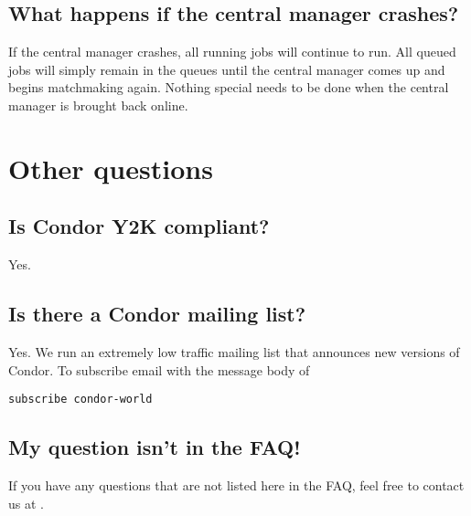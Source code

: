 \subsection{What happens if the central manager crashes?} 

If the central manager crashes, all running jobs will continue to
run. All queued jobs will simply remain in the queues until the central
manager comes up and begins matchmaking again.  Nothing special needs
to be done when the central manager is brought back online. 


\section{Other questions}


\subsection{Is Condor Y2K compliant?}

Yes.

\subsection{Is there a Condor mailing list?}

Yes.  We run an extremely low traffic mailing list that announces new versions of Condor.
To subscribe email
with the message body of
\begin{verbatim}
subscribe condor-world
\end{verbatim}

\subsection{My question isn't in the FAQ!}

If you have any questions that are not listed here in the FAQ, feel free to contact us at .
